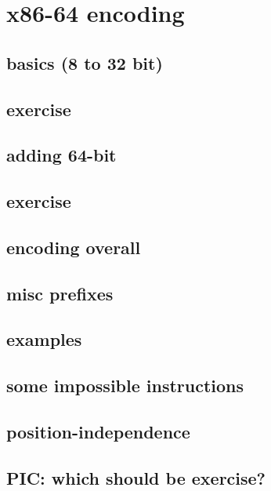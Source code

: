 \section{x86-64 encoding}

\subsection{basics (8 to 32 bit)}


\subsection{exercise}


\subsection{adding 64-bit}


\subsection{exercise}


\subsection{encoding overall}


\subsection{misc prefixes}


\subsection{examples}


\subsection{some impossible instructions}


\subsection{position-independence} 


\subsection{PIC: which should be exercise?}


